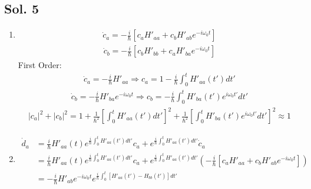 \subsection*{Sol. 5}
\begin{enumerate}
    \item
          \begin{align*}
              \dot c_a = -\frac{i}{\hbar}
                          [c_a H'_{aa} + c_b H'_{ab}e^{-i\omega_0t}]
          \end{align*}
          \begin{align*}
              \dot c_b = -\frac{i}{\hbar}
                          [c_b H'_{bb} + c_a H'_{ba}e^{-i\omega_0t}]
          \end{align*}
          First Order:
          \begin{align*}
              \dot c_a = -\frac{i}{\hbar}
              H'_{aa}\Rightarrow
              c_a =1 -\frac{i}{\hbar}\int_0^t H'_{aa}(t')dt'
          \end{align*}
          \begin{align*}
              \dot c_b = -\frac{i}{\hbar}
              H'_{ba}e^{-i\omega_0t}\Rightarrow
              c_b = -\frac{i}{\hbar}\int_0^
              t H'_{ba}(t')e^{i\omega_0 t'}dt'
          \end{align*}
          \begin{align*}
              |c_a|^2 + |c_b|^2
              =
              1 + \frac{1}{\hbar^2}
              \left[\int_0^t H'_{aa}(t')dt' \right]^2
              +
              \frac{1}{\hbar^2}
              \left[
                  \int_0^t H'_{ba}(t')e^{i\omega_0 t'}dt'
                  \right]^2\approx 1
          \end{align*}
    \item
          \begin{align*}
              \dot d_a & = \frac{i}{\hbar} H'_{aa}(t)
              e^{\frac{i}{\hbar}\int_0^t H'_{aa}(t')dt'}c_a
              +
              e^{\frac{i}{\hbar}\int_0^t H'_{aa}(t')dt'}\dot c_a \\
                       & =
              \frac{i}{\hbar} H'_{aa}(t)
              e^{\frac{i}{\hbar}\int_0^t H'_{aa}(t')dt'}c_a
              +
              e^{\frac{i}{\hbar}\int_0^t H'_{aa}(t')dt'}
              \left(-\frac{i}{\hbar}[c_a H'_{aa} + c_b H'_{ab}e^{-i\omega_0 t}]\right) \\
                       & =
              -\frac{i}{\hbar}
              H'_{ab}e^{-i\omega_0 t} e^{\frac{i}{\hbar}\int_0^t [H'_{aa}(t') - H_{bb}(t')]dt'}

\end{align*}
\end{enumerate}
